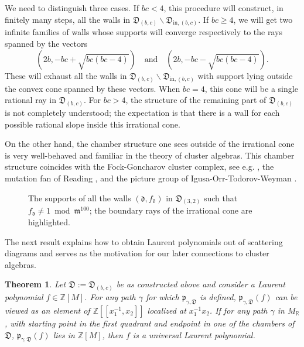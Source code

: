 \documentclass[11pt]{amsart}
\newcommand{\sayDR}[1]{\say[DR]{#1}}
\newcommand{\sayMC}[1]{\say[MC]{#1}}
\newtheorem{theorem}{Theorem}[section]
\theoremstyle{remark}
\numberwithin{equation}{section}
\newcommand{\RR}{\mathbb{R}}
\newcommand{\ZZ}{\mathbb{Z}}
\newcommand{\fd}{\mathfrak{d}}
\newcommand{\fD}{\mathfrak{D}}
\newcommand{\fm}{\mathfrak{m}}
\newcommand{\fp}{\mathfrak{p}}
\begin{document}
We need to distinguish three cases. If $bc<4$, this procedure will construct, in
finitely many steps, all the walls in $\fD_{(b,c)} \smallsetminus
\fD_{\mathrm{in},(b,c)}$.  If $bc\ge4$, we will get two infinite
families of walls whose supports will converge respectively to the rays
spanned by the vectors
\[
  \left(2b,-bc + \sqrt{bc(bc-4)}\right)
  \quad
  \mbox{and}
  \quad
  \left(2b,-bc - \sqrt{bc(bc-4)}\right).
\]
These will exhaust all the walls in $\fD_{(b,c)} \smallsetminus \fD_{\mathrm{in},(b,c)}$
with support lying outside the convex cone spanned by these vectors.  When $bc=4$, this cone will be a single rational ray in $\fD_{(b,c)}$.  For $bc>4$, the structure of the remaining part of 
$\fD_{(b,c)}$ is not completely understood; the expectation is that there is
a wall for each possible rational slope inside this irrational cone.

On the other hand, the chamber structure one sees outside of the irrational cone
is very well-behaved and familiar in the theory of cluster algebras.  This
chamber structure coincides with the Fock-Goncharov cluster complex, see e.g.
\cite[Section 2]{GHKK}, the mutation fan of Reading \cite{R}, and the picture group of
Igusa-Orr-Todorov-Weyman \cite{IOTW}.

\begin{figure}
  
  \caption{The supports of all the walls $(\fd,f_\fd)$ in $\fD_{(3,2)}$ such
    that $f_\fd \neq 1 \bmod \fm^{100}$; the boundary rays of
    the irrational cone are highlighted.} 
  \label{diagram32}
\end{figure}

The next result explains how to obtain Laurent polynomials out of scattering diagrams
and serves as the motivation for our later connections to cluster algebras.
\begin{theorem} 
  \label{univLaurent} 
  Let $\fD:=\fD_{(b,c)}$ be as constructed above and consider a Laurent polynomial $f \in \ZZ[M]$. For any path $\gamma$ for which $\fp_{\gamma,\fD}$ is defined, $\fp_{\gamma,\fD}(f)$ can be viewed as an element of
  $\ZZ[[x_1^{-1},x_2]]$ localized at $x_1^{-1}x_2$.  If for any path $\gamma$ in
  $M_{\RR}$, with starting point in the first quadrant and endpoint in one of the
  chambers of $\fD$, $\fp_{\gamma,\fD}(f)$ lies in $\ZZ[M]$, then $f$ is a universal
  Laurent polynomial.
\end{theorem}
\end{document}
